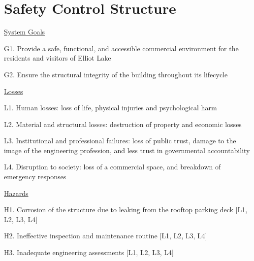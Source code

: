 \documentclass[12pt]{article}
\begin{document}





\section{Safety Control Structure}



\underline{System Goals}

G1. Provide a safe, functional, and accessible commercial environment for the residents and visitors of Elliot Lake

G2. Ensure the structural integrity of the building throughout its lifecycle

\underline{Losses}

L1. Human losses: loss of life, physical injuries and psychological harm

L2. Material and structural losses: destruction of property and economic losses

L3. Institutional and professional failures: loss of public trust, damage to the image of the engineering profession, and less trust in governmental accountability

L4. Disruption to society: loss of a commercial space, and breakdown of emergency responses

\underline{Hazards}

H1. Corrosion of the structure due to leaking from the rooftop parking deck [L1, L2, L3, L4]

H2. Ineffective inspection and maintenance routine [L1, L2, L3, L4]

H3. Inadequate engineering assessments [L1, L2, L3, L4]
\end{document}

